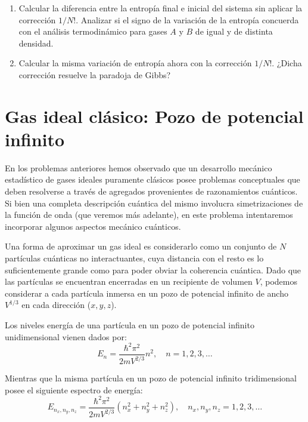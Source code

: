 \documentclass[a4paper,11pt]{article}
\begin{document}
\begin{enumerate}[label=(\alph*),
                  leftmargin=2\parindent,
                  rightmargin=2\parindent]

    \item{Calcular la diferencia entre la entropía final e inicial del
          sistema sin aplicar la corrección $1/N!$.
          Analizar si el signo de la variación de la entropía
          concuerda con el análisis termodinámico para gases $A$ y $B$ de
          igual y de distinta densidad.}

    \item{Calcular la misma variación de entropía ahora con la
          corrección $1/N!$. ¿Dicha corrección resuelve la paradoja
          de Gibbs?}

\end{enumerate}


\section{Gas ideal clásico: Pozo de potencial infinito}

En los problemas anteriores hemos observado que un desarrollo mecánico
estadístico de gases ideales puramente clásicos posee problemas
conceptuales que deben resolverse a través de agregados provenientes
de razonamientos cuánticos.
Si bien una completa descripción cuántica del mismo involucra
simetrizaciones de la función de onda (que veremos más adelante), en
este problema intentaremos incorporar algunos aspectos mecánico
cuánticos.

Una forma de aproximar un gas ideal es considerarlo como un conjunto de
$N$ partículas cuánticas no interactuantes, cuya distancia con el resto
es lo suficientemente grande como para poder obviar la coherencia
cuántica. Dado que las partículas se encuentran encerradas en un
recipiente de volumen $V$, podemos considerar a cada partícula inmersa
en un pozo de potencial infinito de ancho $V^{1/3}$ en cada dirección
($x, y, z$).

Los niveles energía de una partícula en un pozo de potencial infinito
unidimensional vienen dados por:
$$ E_n = \frac{\hbar^2 \pi^2}{2m V^{2/3}} n^2, \quad n=1, 2, 3, \dots $$

\noindent Mientras que la misma partícula en un pozo de potencial infinito
tridimensional posee el siguiente espectro de energía:
$$ E_{n_x, n_y, n_z} = \frac{\hbar^2 \pi^2}{2m V^{2/3}} (n_x^2 + n_y^2 + n_z^2),
\quad n_x, n_y, n_z = 1, 2, 3, \dots $$
\end{document}
